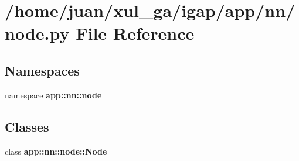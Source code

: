 \section{/home/juan/xul\_\-ga/igap/app/nn/node.py File Reference}
\label{node_8py}
\subsection*{Namespaces}
\begin{CompactItemize}
\item 
namespace {\bf app::nn::node}
\end{CompactItemize}
\subsection*{Classes}
\begin{CompactItemize}
\item 
class {\bf app::nn::node::Node}
\end{CompactItemize}
